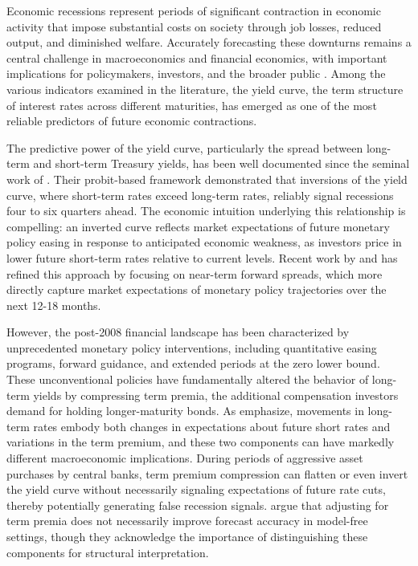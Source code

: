 
Economic recessions represent periods of significant contraction in economic activity that impose substantial costs on society through job losses, reduced output, and diminished welfare. Accurately forecasting these downturns remains a central challenge in macroeconomics and financial economics, with important implications for policymakers, investors, and the broader public \citep{murphyPredictingRecessions1959}. Among the various indicators examined in the literature, the yield curve, the term structure of interest rates across different maturities, has emerged as one of the most reliable predictors of future economic contractions.

The predictive power of the yield curve, particularly the spread between long-term and short-term Treasury yields, has been well documented since the seminal work of \citet{estrellaYieldCurvePredictor1996}. Their probit-based framework demonstrated that inversions of the yield curve, where short-term rates exceed long-term rates, reliably signal recessions four to six quarters ahead. The economic intuition underlying this relationship is compelling: an inverted curve reflects market expectations of future monetary policy easing in response to anticipated economic weakness, as investors price in lower future short-term rates relative to current levels. Recent work by \citet{yorkPredictingRecessionProbabilities2018} and \citet{sharpeNearTermForwardYield2018} has refined this approach by focusing on near-term forward spreads, which more directly capture market expectations of monetary policy trajectories over the next 12-18 months.

However, the post-2008 financial landscape has been characterized by unprecedented monetary policy interventions, including quantitative easing programs, forward guidance, and extended periods at the zero lower bound. These unconventional policies have fundamentally altered the behavior of long-term yields by compressing term premia, the additional compensation investors demand for holding longer-maturity bonds. As \citet{rudebusch2006macroeconomic} emphasize, movements in long-term rates embody both changes in expectations about future short rates and variations in the term premium, and these two components can have markedly different macroeconomic implications. During periods of aggressive asset purchases by central banks, term premium compression can flatten or even invert the yield curve without necessarily signaling expectations of future rate cuts, thereby potentially generating false recession signals. \citet{bauer2018information} argue that adjusting for term premia does not necessarily improve forecast accuracy in model-free settings, though they acknowledge the importance of distinguishing these components for structural interpretation.

